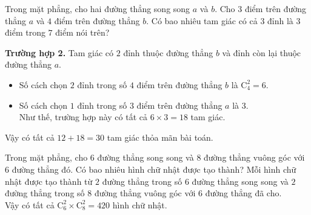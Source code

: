 \begin{bt}%
	Trong mặt phẳng, cho hai đường thẳng song song $a$ và $b$. Cho $3$ điểm trên đường thẳng $a$ và $4$ điểm trên đường thẳng $b$. Có bao nhiêu tam giác có cả $3$ đỉnh là $3$ điểm trong $7$ điểm nói trên?
	\loigiai
	{\noindent
		{\bf Trường hợp 2.} Tam giác có $2$ đỉnh thuộc đường thẳng $b$ và đỉnh còn lại thuộc đường thẳng $a$.
		\begin{itemize}
			\item Số cách chọn $2$ đỉnh trong số $4$ điểm trên đường thẳng $b$ là $\mathrm{C}_4^2=6$.
			\item Số cách chọn $1$ đỉnh trong số $3$ điểm trên đường thẳng $a$ là $3$.\\
			Như thế, trường hợp này có tất cả $6\times 3=18$ tam giác.
		\end{itemize}
		Vậy có tất cả $12+18=30$ tam giác thỏa mãn bài toán.
	}
\end{bt}

\begin{bt}%
	Trong mặt phẳng, cho $6$ đường thẳng song song và $8$ đường thẳng vuông góc với $6$ đường thẳng đó. Có bao nhiêu hình chữ nhật được tạo thành?
	\loigiai
	{Mỗi hình chữ nhật được tạo thành từ $2$ đường thẳng trong số $6$ đường thẳng song song và $2$ đường thẳng trong số $8$ đường thẳng vuông góc với $6$ đường thẳng đã cho.\\
		Vậy có tất cả $\mathrm{C}_6^2\times\mathrm{C}_8^2=420$ hình chữ nhật.
	}
\end{bt}

